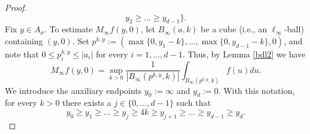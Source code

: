 \documentclass[12pt]{amsart}
\numberwithin{equation}{section}
\theoremstyle{plain}
\theoremstyle{definition}
\theoremstyle{remark}
\begin{document}
\begin{proof}
\begin{equation}
  y_{2}\ge \ldots \ge y_{d-1}\}.
\end{equation}
Fix $y\in A_\sigma$. To estimate $M_\infty f(y,0)$, let $B_\infty (a, k)$
be a cube (i.e., an $\ell_\infty$-ball)   containing $(y,0)$.
Set $p^{k,y}:=(\max\{0,y_1-k\},\ldots,\max\{0,y_{d-1}-k\},0)$, and
note that
 $0\le p^{k,y}_i\le |a_i|$  for every $i=1,\ldots,d -1$. Thus,
by Lemma \ref{bdl2} we have
\begin{equation*}
  M_\infty f(y,0)=\sup_{k>0}\frac{1}{|B_\infty (p^{k,y}, k)|}\int_{B_\infty (p^{k,y}, k)}f(u)du.
\end{equation*}
We introduce the auxiliary endpoints $y_0:=\infty$ and
$y_d:= 0$. With this notation,
for every $k>0$ there exists a $j\in\{0,\ldots,d-1\}$ such that
\begin{equation}\label{ordencoordenadas}
y_0 \ge y_1\ge \ldots\ge y_j\ge 4k\ge y_{j+1}\ge\ldots\ge
y_{d-1}\ge y_d.
\end{equation}


\end{proof}
\end{document}
